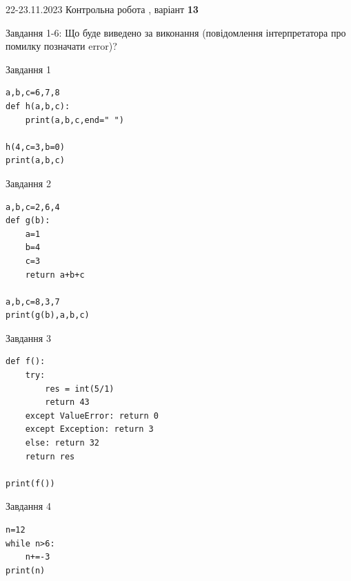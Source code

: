 \documentclass[12pt, ukrainian]{article}
\begin{document}
{{22-23.11.2023 Контрольна робота , варіант  \No \textbf { 13 }\par}}
{

Завдання 1-6: Що буде виведено за виконання (повідомлення інтерпретатора про помилку позначати error)?


\begin{minipage}[t]{9.7cm}                
{\begin{center}Завдання {1}\end{center}}
\begin{verbatim}
a,b,c=6,7,8
def h(a,b,c):
    print(a,b,c,end=" ")

h(4,c=3,b=0)
print(a,b,c)
\end{verbatim}     
\end{minipage}
\vline \hspace{8mm}
\begin{minipage}[t]{8.0cm}                
{\begin{center}Завдання {2}\end{center}}
\begin{verbatim}
a,b,c=2,6,4
def g(b):
    a=1
    b=4
    c=3
    return a+b+c

a,b,c=8,3,7
print(g(b),a,b,c)
\end{verbatim}     
\end{minipage}

\vspace{15mm}
\begin{minipage}[t]{9.7cm}                
{\begin{center}Завдання {3}\end{center}}
\begin{verbatim}
def f():
    try:
        res = int(5/1)
        return 43
    except ValueError: return 0
    except Exception: return 3
    else: return 32
    return res

print(f())
\end{verbatim}     
\end{minipage}
\vline \hspace{8mm}
\begin{minipage}[t]{8.0cm}                
{\begin{center}Завдання {4}\end{center}}
\begin{verbatim}
n=12
while n>6:
    n+=-3
print(n)
\end{verbatim}     
\end{minipage}

}
\end{document}
